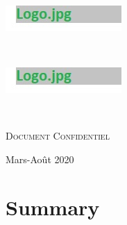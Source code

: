\documentclass[a4paper]{article}
\begin{document}
\begin{titlepage}

    \begin{minipage}{0.49\textwidth}
        \begin{flushleft}
            \large
            \includegraphics[width=0.5\linewidth]{../img/logo}\\ %
        \end{flushleft}

    \end{minipage}
    ~
    \begin{minipage}{0.49\textwidth}
        \begin{flushright} \large
            \includegraphics[width=0.5\linewidth]{../img/logo}\\[1cm]
        \end{flushright}
    \end{minipage}\\[2cm]
    \begin{center}
        {\huge \textsc{Document Confidentiel} \\[2cm] }
    \end{center}


    \vspace*{\fill}
    \begin{center}
        {\large Mars-Août 2020 \\ }
    \end{center}

\end{titlepage}

\newpage
\section*{Summary}
\end{document}
